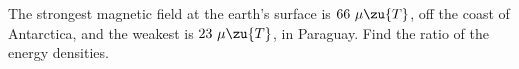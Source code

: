 The strongest magnetic field at the earth's surface is $66\ \mu\zu{T}$, off the coast
of Antarctica, and the weakest is $23\ \mu\zu{T}$, in Paraguay. Find the ratio of
the energy densities.\answercheck\hwendpart
